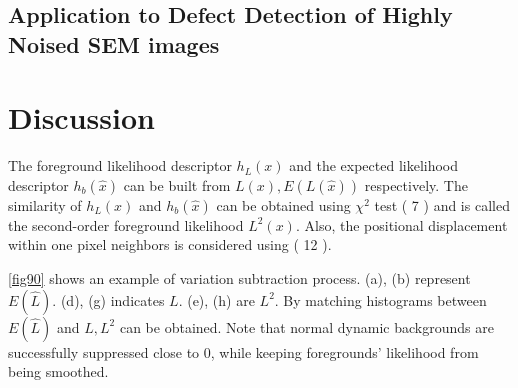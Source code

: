 \documentclass[a4paper,twocolumn, 10pt]{article}
\begin{document}
\subsection{Application to Defect Detection of Highly Noised SEM images}



\section{Discussion}





The foreground likelihood descriptor \begin{math} h_L(x) \end{math} and the expected likelihood descriptor
\begin{math} h_b(\hat{x}) \end{math} can be built from \begin{math} L(x), E(L(\hat{x})) \end{math} respectively.
The similarity of \begin{math} h_L(x) \end{math}  and \begin{math} h_b(\hat{x}) \end{math} can be obtained using 
\begin{math} \chi ^2 \end{math} test ( 7 ) and is called the second-order foreground likelihood \begin{math} L^2(x) \end{math}.
Also, the positional displacement within one pixel neighbors is considered using ( 12 ).

\ref{fig90} shows an example of variation subtraction process. (a), (b) represent \begin{math} E(\hat{L}) \end{math}.
(d), (g) indicates \begin{math} L \end{math}. (e), (h) are \begin{math} L^2 \end{math}.
By matching histograms between \begin{math} E(\hat{L}) \end{math} and \begin{math} L, L^2 \end{math} can be obtained.
Note that normal dynamic backgrounds are successfully suppressed close to 0, while keeping foregrounds' likelihood from being smoothed.










\end{document}
